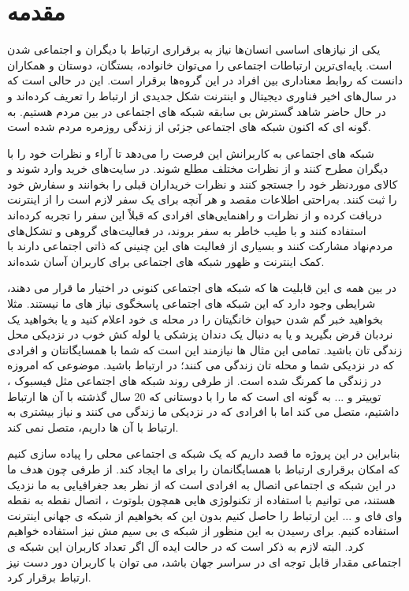 
\chapter{مقدمه}
\thispagestyle{empty}
یکی از نیازهای اساسی انسان‌ها نیاز به برقراری ارتباط با دیگران و اجتماعی شدن است. پایه‌ای‌ترین ارتباطات اجتماعی را می‌توان خانواده، بستگان، دوستان و همکاران دانست که روابط معناداری بین افراد در این گروه‌ها برقرار است. این در حالی است که در سال‌های اخیر فناوری دیجیتال و اینترنت شکل جدیدی از ارتباط را تعریف کرده‌اند و در حال حاضر شاهد گسترش بی سابقه شبکه های اجتماعی
 در بین مردم هستیم. به گونه ای که اکنون شبکه های اجتماعی جزئی از زندگی روزمره مردم شده است. 
 
 شبکه های اجتماعی به کاربرانش این فرصت را می‌دهد تا آراء و نظرات خود را با دیگران مطرح کنند و از نظرات مختلف مطلع شوند. در سایت‌های خرید وارد شوند و کالای موردنظر خود را جستجو کنند و نظرات خریداران قبلی را بخوانند و سفارش خود را ثبت کنند. به‌راحتی اطلاعات مقصد و هر آنچه برای یک سفر لازم است را از اینترنت دریافت کرده و از نظرات و راهنمایی‌های افرادی که قبلاً این سفر را تجربه کرده‌اند استفاده کنند و با طیب خاطر به سفر بروند، در فعالیت‌های گروهی و تشکل‌های مردم‌نهاد مشارکت کنند و بسیاری از فعالیت های این چنینی که ذاتی اجتماعی دارند با کمک اینترنت و ظهور شبکه های اجتماعی برای کاربران آسان شده‌اند.
 
در بین همه ی این قابلیت ها که شبکه های اجتماعی کنونی در اختیار ما قرار می دهند، شرایطی وجود دارد که این شبکه های اجتماعی پاسخگوی نیاز های ما نیستند. مثلا بخواهید خبر گم شدن حیوان خانگیتان را در محله ی خود اعلام کنید و یا بخواهید یک نردبان قرض بگیرید و یا به دنبال یک دندان پزشکی یا لوله کش خوب در نزدیکی  محل زندگی تان باشید. تمامی این مثال ها نیازمند این است که شما با همسایگانتان و افرادی که در نزدیکی شما و محله تان زندگی می کنند؛ در ارتباط باشید. موضوعی که امروزه در زندگی ما کمرنگ شده است. از طرفی روند شبکه های اجتماعی مثل فیسبوک
، توییتر 
و ... به گونه ای است که ما را با دوستانی که 20 سال گذشته با آن ها ارتباط داشتیم، متصل می کند اما با افرادی که در نزدیکی ما زندگی می کنند و نیاز بیشتری به ارتباط با آن ها داریم، متصل نمی کند.

بنابراین در این پروژه ما قصد داریم که یک شبکه ی اجتماعی محلی را پیاده سازی کنیم که امکان برقراری ارتباط با همسایگانمان را برای ما ایجاد کند. از طرفی چون هدف ما در این شبکه ی اجتماعی اتصال به افرادی است که از نظر بعد جغرافیایی به ما نزدیک هستند، می توانیم با استفاده از تکنولوژی هایی همچون بلوتوث
، اتصال نقطه به نقطه وای فای 
و ... این ارتباط را حاصل کنیم بدون این که بخواهیم از شبکه ی جهانی اینترنت
 استفاده کنیم. برای رسیدن به این منظور از شبکه ی بی سیم مش 
 نیز استفاده خواهیم کرد. البته لازم به ذکر است که در حالت ایده آل اگر تعداد کاربران این شبکه ی اجتماعی مقدار قابل توجه ای در سراسر جهان باشد، می توان با کاربران دور دست نیز ارتباط برقرار کرد. 

